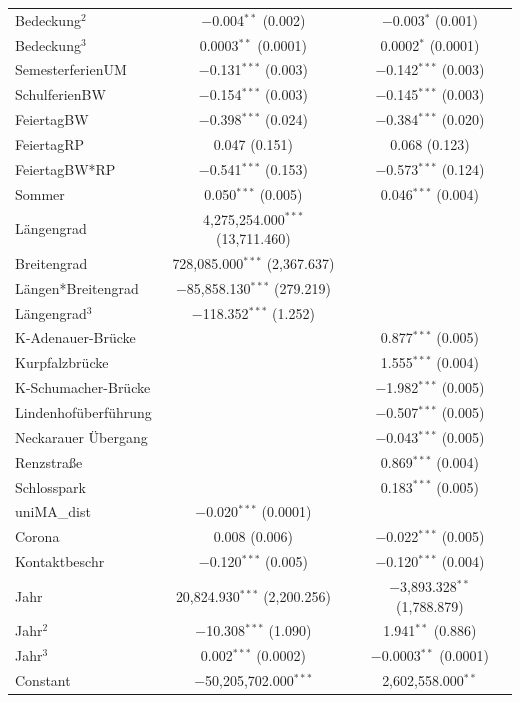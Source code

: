 \documentclass[a4paper,12pt]{thesis}
\begin{document}
\begin{longtable}{@{\extracolsep{-5pt}}lcc}
		Bedeckung$^2$ & $-$0.004$^{**}$ (0.002) & $-$0.003$^{*}$ (0.001) \\ 
		Bedeckung$^3$ & 0.0003$^{**}$ (0.0001) & 0.0002$^{*}$ (0.0001) \\ 
		SemesterferienUM & $-$0.131$^{***}$ (0.003) & $-$0.142$^{***}$ (0.003) \\ 
		SchulferienBW & $-$0.154$^{***}$ (0.003) & $-$0.145$^{***}$ (0.003) \\ 
		FeiertagBW & $-$0.398$^{***}$ (0.024) & $-$0.384$^{***}$ (0.020) \\ 
		FeiertagRP & 0.047 (0.151) & 0.068 (0.123) \\ 
		FeiertagBW*RP & $-$0.541$^{***}$ (0.153) & $-$0.573$^{***}$ (0.124) \\ 
		Sommer & 0.050$^{***}$ (0.005) & 0.046$^{***}$ (0.004) \\ 
		Längengrad & 4,275,254.000$^{***}$ (13,711.460) &  \\ 
		Breitengrad & 728,085.000$^{***}$ (2,367.637) &  \\ 
		Längen*Breitengrad & $-$85,858.130$^{***}$ (279.219) &  \\ 
		Längengrad$^3$ & $-$118.352$^{***}$ (1.252) &  \\ 
		K-Adenauer-Brücke &  & 0.877$^{***}$ (0.005) \\ 
		Kurpfalzbrücke &  & 1.555$^{***}$ (0.004) \\ 
		K-Schumacher-Brücke &  & $-$1.982$^{***}$ (0.005) \\ 
		Lindenhofüberführung &  & $-$0.507$^{***}$ (0.005) \\ 
		Neckarauer Übergang &  & $-$0.043$^{***}$ (0.005) \\ 
		Renzstraße &  & 0.869$^{***}$ (0.004) \\ 
		Schlosspark &  & 0.183$^{***}$ (0.005) \\ 
		uniMA\_dist & $-$0.020$^{***}$ (0.0001) &  \\ 
		Corona & 0.008 (0.006) & $-$0.022$^{***}$ (0.005) \\ 
		Kontaktbeschr & $-$0.120$^{***}$ (0.005) & $-$0.120$^{***}$ (0.004) \\ 
		Jahr & 20,824.930$^{***}$ (2,200.256) & $-$3,893.328$^{**}$ (1,788.879) \\ 
		Jahr$^2$ & $-$10.308$^{***}$ (1.090) & 1.941$^{**}$ (0.886) \\ 
		Jahr$^3$ & 0.002$^{***}$ (0.0002) & $-$0.0003$^{**}$ (0.0001) \\ 
		Constant & $-$50,205,702.000$^{***}$  & 2,602,558.000$^{**}$  \\

\end{longtable}
\end{document}

